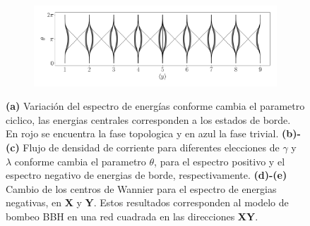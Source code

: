 \begin{figure}[h!]
     \begin{minipage}[h!]{1\textwidth}
        \begin{subfigure}[b!]{1.0 \textwidth}
            \caption{}
            \includegraphics[width=\textwidth]{Imagenes/Resultados_pump_Cuadrado/xy/wannier_centery.pdf}
        \end{subfigure}\hspace*{-0.5em}
    \end{minipage}
    
    \caption{\textbf{(a)} Variación del espectro de energías conforme cambia el parametro ciclico, las energias centrales corresponden a los estados de borde. En rojo se encuentra la fase topologica y en azul la fase trivial. \textbf{(b)-(c)} Flujo de densidad de corriente para diferentes elecciones de $\gamma$ y $\lambda$ conforme cambia el parametro $\theta$, para el espectro positivo y el espectro negativo de energias de borde, respectivamente. \textbf{(d)-(e)} Cambio de los centros de Wannier para el espectro de energias negativas, en \textbf{X} y \textbf{Y}. Estos resultados corresponden al modelo de bombeo BBH en una red cuadrada en las direcciones \textbf{XY}.}
    \label{fig:Pump_cuadrado_xy}
\end{figure}
